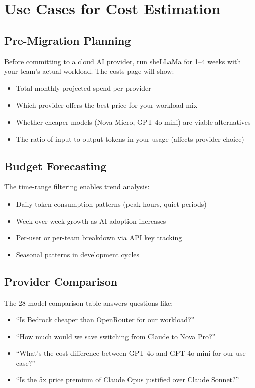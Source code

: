 \documentclass[11pt,a4paper]{article}
\begin{document}
\section{Use Cases for Cost Estimation}

\subsection{Pre-Migration Planning}

Before committing to a cloud AI provider, run sheLLaMa for 1--4 weeks with your team's actual workload. The costs page will show:

\begin{itemize}
  \item Total monthly projected spend per provider
  \item Which provider offers the best price for your workload mix
  \item Whether cheaper models (Nova Micro, GPT-4o mini) are viable alternatives
  \item The ratio of input to output tokens in your usage (affects provider choice)
\end{itemize}

\subsection{Budget Forecasting}

The time-range filtering enables trend analysis:

\begin{itemize}
  \item Daily token consumption patterns (peak hours, quiet periods)
  \item Week-over-week growth as AI adoption increases
  \item Per-user or per-team breakdown via API key tracking
  \item Seasonal patterns in development cycles
\end{itemize}

\subsection{Provider Comparison}

The 28-model comparison table answers questions like:

\begin{itemize}
  \item ``Is Bedrock cheaper than OpenRouter for our workload?''
  \item ``How much would we save switching from Claude to Nova Pro?''
  \item ``What's the cost difference between GPT-4o and GPT-4o mini for our use case?''
  \item ``Is the 5x price premium of Claude Opus justified over Claude Sonnet?''
\end{itemize}
\end{document}
